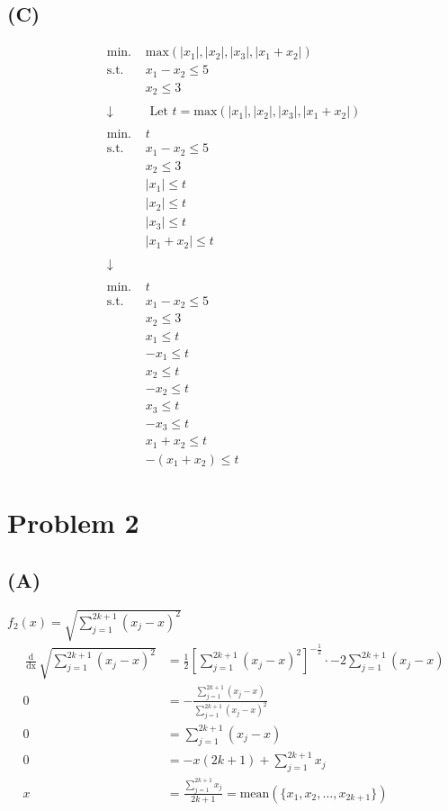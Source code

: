 \documentclass[12pt]{article}
\begin{document}
\newpage
\subsection*{(C)}
\begin{align*}
    \text{min. } & \text{max}(|x_1|, |x_2|, |x_3|, |x_1 + x_2|) \\
    \text{s.t. } & x_1 - x_2 \leq 5 \\
    & x_2 \leq 3 \\
    \\
    \downarrow & \text{ Let } t= \text{max}(|x_1|, |x_2|, |x_3|, |x_1 + x_2|) \\
    \\
    \text{min. } & t \\
    \text{s.t. } & x_1 - x_2 \leq 5 \\
    & x_2 \leq 3 \\
    & |x_1| \leq t \\
    & |x_2| \leq t \\
    & |x_3| \leq t \\
    & |x_1 + x_2| \leq t \\
    \\
    \downarrow \\
    \\
    \text{min. } & t \\
    \text{s.t. } & x_1 - x_2 \leq 5 \\
    & x_2 \leq 3 \\
    & x_1 \leq t \\
    & -x_1 \leq t \\
    & x_2 \leq t \\
    & -x_2 \leq t \\
    & x_3 \leq t \\
    & -x_3 \leq t \\
    & x_1 + x_2 \leq t \\
    & -(x_1 + x_2) \leq t
\end{align*}

\newpage
\section*{Problem 2}
\subsection*{(A)}
$f_2(x) = \sqrt{\sum_{j=1}^{2k+1}(x_j - x)^2}$
\begin{align*}
    \frac{\mathop{d}}{\mathop{dx}}\sqrt{\sum_{j=1}^{2k+1}(x_j - x)^2} &= \frac{1}{2} [\sum_{j=1}^{2k+1}(x_j - x)^2]^{-\frac{1}{2}} \cdot -2 \sum_{j=1}^{2k+1}(x_j - x) \\
    0 &= -\frac{\sum_{j=1}^{2k+1}(x_j - x)}{\sum_{j=1}^{2k+1}(x_j - x)^2} \\
    0 &= \sum_{j=1}^{2k+1}(x_j - x) \\
    0 &= -x(2k+1) + \sum_{j=1}^{2k+1}x_j \\
    x &= \frac{\sum_{j=1}^{2k+1}x_j}{2k+1} = \text{mean}(\{x_1, x_2, \dots, x_{2k+1}\})
\end{align*}
\end{document}

